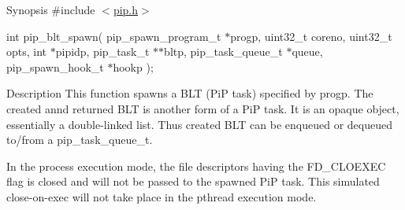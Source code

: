 \begin{DoxyParagraph}{Synopsis}
\#include $<$\hyperlink{pip_8h_source}{pip.\-h}$>$ \par
int pip\-\_\-blt\-\_\-spawn( pip\-\_\-spawn\-\_\-program\-\_\-t $\ast$progp, uint32\-\_\-t coreno, uint32\-\_\-t opts, int $\ast$pipidp, pip\-\_\-task\-\_\-t $\ast$$\ast$bltp, pip\-\_\-task\-\_\-queue\-\_\-t $\ast$queue, pip\-\_\-spawn\-\_\-hook\-\_\-t $\ast$hookp );
\end{DoxyParagraph}
\begin{DoxyParagraph}{Description}
This function spawns a B\-L\-T (Pi\-P task) specified by {\ttfamily progp}. The created annd returned B\-L\-T is another form of a Pi\-P task. It is an opaque object, essentially a double-\/linked list. Thus created B\-L\-T can be enqueued or dequeued to/from a {\ttfamily pip\-\_\-task\-\_\-queue\-\_\-t}. 
\end{DoxyParagraph}
\begin{DoxyParagraph}{}
In the process execution mode, the file descriptors having the {\ttfamily F\-D\-\_\-\-C\-L\-O\-E\-X\-E\-C} flag is closed and will not be passed to the spawned Pi\-P task. This simulated close-\/on-\/exec will not take place in the pthread execution mode.
\end{DoxyParagraph}

